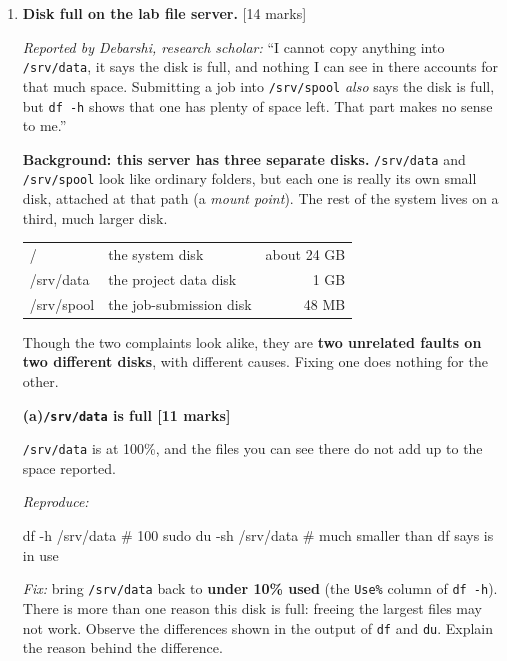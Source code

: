 \documentclass[11pt,a4paper]{article}
\newcommand{\hd}[1]{\medskip\textbf{#1}\par\nopagebreak}
\begin{document}
\begin{enumerate}[label=\textbf{Q\arabic*.},leftmargin=2.6em,labelsep=0.6em,itemsep=1.6em,topsep=1.2em]

\item \textbf{Disk full on the lab file server.} \hfill [14 marks]

\emph{Reported by Debarshi, research scholar:} ``I cannot copy anything into
\texttt{/srv/data}, it says the disk is full, and nothing I can see in there
accounts for that much space. Submitting a job into \texttt{/srv/spool}
\emph{also} says the disk is full, but \texttt{df -h} shows that one has plenty
of space left. That part makes no sense to me.''

\begin{framed}
\textbf{Background: this server has three separate disks.}
\texttt{/srv/data} and \texttt{/srv/spool} look like ordinary folders, but each
one is really its own small disk, attached at that path (a \emph{mount point}).
The rest of the system lives on a third, much larger disk.

\smallskip
\begin{tabular}{@{}>{\ttfamily}l l r@{}}
/          & the system disk         & about 24 GB \\
/srv/data  & the project data disk   & 1 GB \\
/srv/spool & the job-submission disk & 48 MB \\
\end{tabular}
\smallskip

\end{framed}

Though the two complaints look alike, they are \textbf{two unrelated faults on two different disks}, with different causes. Fixing one does nothing for the other. 

\hd{(a)\enspace \texttt{/srv/data} is full \hfill [11 marks]}
\texttt{/srv/data} is at 100\%, and the files you can see there do not add up
to the space reported.

\textit{Reproduce:}
\begin{shell}
df -h /srv/data                        # 100%
sudo du -sh /srv/data                  # much smaller than df says is in use
\end{shell}

\textit{Fix:} bring \texttt{/srv/data} back to \textbf{under 10\% used} (the
\texttt{Use\%} column of \texttt{df -h}). There is more than one reason this
disk is full: freeing the largest files may not work. Observe the differences shown in the output of \texttt{df} and \texttt{du}. Explain the reason behind the difference.


\end{enumerate}
\end{document}
